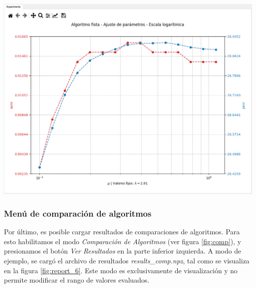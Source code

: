 \documentclass[12pt,twoside,letter]{ol-softwaremanual}
\newenvironment{Figure}
  {\par\medskip\noindent\minipage{\linewidth}}
  {\endminipage\par\medskip}
\begin{document}
\begin{Figure}
    \centering
    \includegraphics[width=1\linewidth]{report-5.png}
    \label{fig:report_5}
\end{Figure}

\subsubsection{Menú de comparación de algoritmos}

Por último, es posible cargar resultados de comparaciones de algoritmos. Para esto habilitamos el modo \textit{Comparación de Algoritmos} (ver figura \ref{fig:comp}), y presionamos el botón \textit{Ver Resultados} en la parte inferior izquierda. A modo de ejemplo, se cargó el archivo de resultados \emph{results\_comp.npz}, tal como se visualiza en la figura \ref{fig:report_6}. Este modo es exclusivamente de visualización y no permite modificar el rango de valores evaluados.
\end{document}
